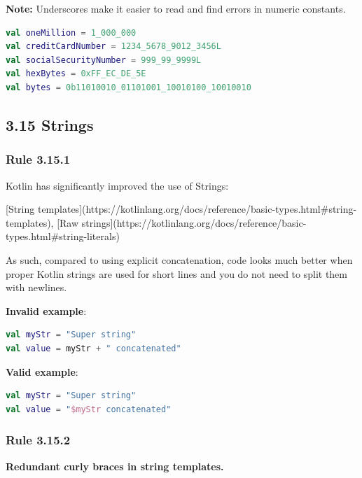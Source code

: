 {{{{\textbf{Note:} Underscores make it easier to read and find errors in numeric constants.

\begin{lstlisting}[language=Kotlin]
val oneMillion = 1_000_000
val creditCardNumber = 1234_5678_9012_3456L
val socialSecurityNumber = 999_99_9999L
val hexBytes = 0xFF_EC_DE_5E
val bytes = 0b11010010_01101001_10010100_10010010
\end{lstlisting}


\subsection*{\textbf{3.15 Strings}}

\subsubsection*{\textbf{Rule 3.15.1}}
\leavevmode\newline

Kotlin has significantly improved the use of Strings: 

[String templates](https://kotlinlang.org/docs/reference/basic-types.html\#string-templates), [Raw strings](https://kotlinlang.org/docs/reference/basic-types.html\#string-literals)

As such, compared to using explicit concatenation, code looks much better when proper Kotlin strings are used for short lines and you do not need to split them with newlines.



\textbf{Invalid example}:

\begin{lstlisting}[language=Kotlin]
val myStr = "Super string"
val value = myStr + " concatenated"
\end{lstlisting}


\textbf{Valid example}:

\begin{lstlisting}[language=Kotlin]
val myStr = "Super string"
val value = "$myStr concatenated"
\end{lstlisting}


\subsubsection*{\textbf{Rule 3.15.2}}
\leavevmode\newline

\textbf{Redundant curly braces in string templates.}



}}}}
